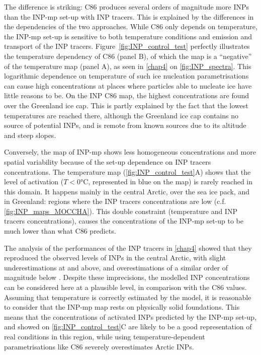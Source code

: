     The difference is striking: C86 produces several orders of magnitude more INPs than the INP-mp set-up with INP tracers.
    This is explained by the differences in the dependencies of the two approaches. While C86 only depends on temperature, the INP-mp set-up is sensitive to both temperature conditions and emission and transport of the INP tracers.
    Figure~\ref{fig:INP_control_test} perfectly illustrates the temperature dependency of C86 (panel B), of which the map is a ``negative'' of the temperature map (panel A), as seen in \cref{chap4} on \cref{fig:INP_spectra}.
    This logarithmic dependence on temperature of such ice nucleation parametrisations can cause high concentrations at places where particles able to nucleate ice have little reasons to be.
    On the INP C86 map, the highest concentrations are found over the Greenland ice cap. This is partly explained by the fact that the lowest temperatures are reached there, although the Greenland ice cap contains no source of potential INPs, and is remote from known sources due to its altitude and steep slopes.  

    Conversely, the map of INP-mp shows less homogeneous concentrations and more spatial variability because of the set-up dependence on INP tracers concentrations.
    The temperature map (\cref{fig:INP_control_test}A) shows that the level of activation ($T<0$\si{\degreeCelsius}, represented in blue on the map) is rarely reached in this domain. It happens mainly in the central Arctic, over the sea ice pack, and in Greenland: regions where the INP tracers concentrations are low (c.f. \cref{fig:INP_maps_MOCCHA}). %
    This double constraint (temperature and INP tracers concentrations), causes the concentrations of the INP-mp set-up to be much lower than what C86 predicts.

    The analysis of the performances of the INP tracers in \cref{chap4} showed that they reproduced the observed levels of INPs in the central Arctic, with slight underestimations at  and above, and overestimations of a similar order of magnitude below .
    Despite these imprecisions, the modelled INP concentrations can be considered here at a plausible level, in comparison with the C86 values.
    Assuming that temperature is correctly estimated by the model, it is reasonable to consider that the INP-mp map rests on physically solid foundations.
    This means that the concentrations of activated INPs predicted by the INP-mp set-up, and showed on \cref{fig:INP_control_test}C are likely to be a good representation of real conditions in this region, while using temperature-dependent parametrisations like C86 severely overestimates Arctic INPs.
    \vspace{\baselineskip}

